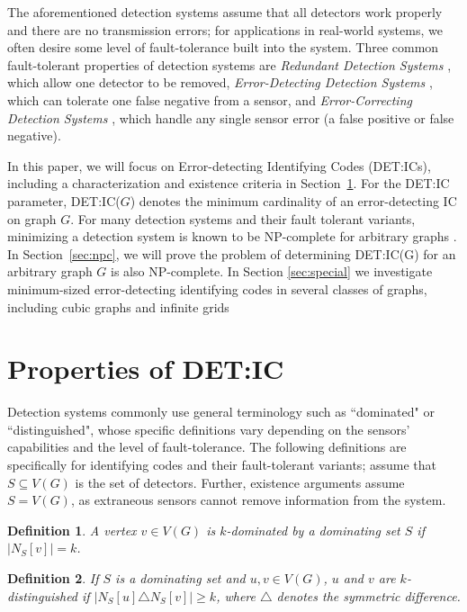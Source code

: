 \documentclass{article}
\newtheorem{definition}{Definition}
\begin{document}
The aforementioned detection systems assume that all detectors work properly and there are no transmission errors; for applications in real-world systems, we often desire some level of fault-tolerance built into the system.
Three common fault-tolerant properties of detection systems are \emph{Redundant Detection Systems} \cite{redic, redld, ftsets}, which allow one detector to be removed, \emph{Error-Detecting Detection Systems} \cite{ourtri, detld, ftld}, which can tolerate one false negative from a sensor, and \emph{Error-Correcting Detection Systems} \cite{our3-4, errld, ft-old-cubic}, which handle any single sensor error (a false positive or false negative).

In this paper, we will focus on Error-detecting Identifying Codes (DET:ICs), including a characterization and existence criteria in Section~\ref{sec:detic-char}.
For the DET:IC parameter, DET:IC($G$) denotes the minimum cardinality of an error-detecting IC on graph $G$.
For many detection systems and their fault tolerant variants, minimizing a detection system is known to be NP-complete for arbitrary graphs \cite{NP-complete-ic, NP-complete-ld, errld, redld, detld, redic, old}.
In Section~\ref{sec:npc}, we will prove the problem of determining DET:IC(G) for an arbitrary graph $G$ is also NP-complete.
In Section \ref{sec:special} we investigate minimum-sized error-detecting identifying codes in several classes of graphs, including cubic graphs and infinite grids

\section{Properties of DET:IC}\label{sec:detic-char}

Detection systems commonly use general terminology such as ``dominated" or ``distinguished", whose specific definitions vary depending on the sensors' capabilities and the level of fault-tolerance.
The following definitions are specifically for identifying codes and their fault-tolerant variants; assume that $S \subseteq V(G)$ is the set of detectors.
Further, existence arguments assume $S = V(G)$, as extraneous sensors cannot remove information from the system.

\begin{definition}\label{def:k-dom}
A vertex $v \in V(G)$ is \emph{$k$-dominated} by a dominating set $S$ if $|N_S[v]| = k$.
\end{definition}

\begin{definition}\label{def:k-disty}
If $S$ is a dominating set and $u,v \in V(G)$, $u$ and $v$ are \emph{$k$-distinguished} if $|N_S[u] \triangle N_S[v]| \ge k$, where $\triangle$ denotes the symmetric difference.
\end{definition}
\end{document}

